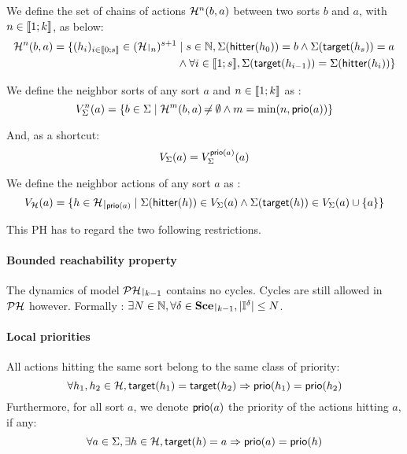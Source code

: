 We define the set of chains of actions $\mathcal{H}^n(b, a)$ between two sorts $b$ and $a$, with $n \in \llbracket 1; k \rrbracket$, as below:
\begin{align*}
\PHh^n(b, a) = \{ (h_i)_{i \in \segm{0}{s}} \in (\restriction{\PHh}{n})^{s+1} &\mid s \in \sN, \PHsort(\PHhitter(h_0)) = b \wedge \PHsort(\PHtarget(h_s)) = a \\
  & \wedge \forall i \in \segm{1}{s}, \PHsort(\PHtarget(h_{i-1})) = \PHsort(\PHhitter(h_{i})) \}
\end{align*}

We define the neighbor  sorts of any sort $a$ and $n \in \llbracket 1; k \rrbracket$ as :
$$
V_\Sigma^n(a) = \{ b \in \Sigma \mid \mathcal{H}^m(b, a) \not\nobreak\mkern -2mu = \emptyset \wedge m = \min(n, \mathsf{prio}(a)) \}
$$

And, as a shortcut:
$$
V_\Sigma(a) = V_\Sigma^{\mathsf{prio}(a)}(a)
$$

We define the neighbor actions of any sort $a$ as :
$$
\Vh(a) = \{ h \in \restriction{\PHh}{\prio(a)} \mid \PHsort(\PHhitter(h)) \in \Vs(a) \wedge \PHsort(\PHtarget(h)) \in \Vs(a) \cup \{ a \} \}
$$

This PH has to regard the two following restrictions.


\paragraph{Bounded reachability property}
The dynamics of model $\restriction{\PH}{k-1}$ contains no cycles. Cycles are still allowed in $\mathcal{PH}$ however.
Formally : $\exists N \in \sN, \forall \delta \in \restriction{\Sce}{k-1}, |\indexes{\delta}| \leq N$.


\paragraph{Local priorities}
All actions hitting the same sort belong to the same class of priority:
$$\forall h_1, h_2 \in \mathcal{H}, \mathsf{target}(h_1) = \mathsf{target}(h_2) \Rightarrow \mathsf{prio}(h_1) = \mathsf{prio}(h_2)$$
Furthermore, for all sort $a$, we denote $\mathsf{prio}(a)$ the priority of the actions hitting $a$, if any:
$$\forall a \in \Sigma, \exists h \in \mathcal{H}, \mathsf{target}(h) = a \Rightarrow \mathsf{prio}(a) = \mathsf{prio}(h)$$

